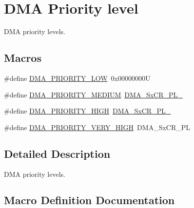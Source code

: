 \hypertarget{group___d_m_a___priority__level}{}\section{D\+MA Priority level}
\label{group___d_m_a___priority__level}


D\+MA priority levels.  


\subsection*{Macros}
\begin{DoxyCompactItemize}
\item 
\#define \mbox{\hyperlink{group___d_m_a___priority__level_ga0d1ed2bc9229ba3c953002bcf3a72130}{D\+M\+A\+\_\+\+P\+R\+I\+O\+R\+I\+T\+Y\+\_\+\+L\+OW}}~0x00000000U
\item 
\#define \mbox{\hyperlink{group___d_m_a___priority__level_gad6fbeee76fd4a02cbed64365bb4c1781}{D\+M\+A\+\_\+\+P\+R\+I\+O\+R\+I\+T\+Y\+\_\+\+M\+E\+D\+I\+UM}}~\mbox{\hyperlink{group___peripheral___registers___bits___definition_ga41b1b2f7bd6f0af932ff0fb7df9336b6}{D\+M\+A\+\_\+\+Sx\+C\+R\+\_\+\+P\+L\+\_}}
\item 
\#define \mbox{\hyperlink{group___d_m_a___priority__level_ga6b2f5c5e22895f8b4bd52a27ec6cae2a}{D\+M\+A\+\_\+\+P\+R\+I\+O\+R\+I\+T\+Y\+\_\+\+H\+I\+GH}}~\mbox{\hyperlink{group___peripheral___registers___bits___definition_ga81817adc8c0ee54dea0f67a1a9e8eb77}{D\+M\+A\+\_\+\+Sx\+C\+R\+\_\+\+P\+L\+\_}}
\item 
\#define \mbox{\hyperlink{group___d_m_a___priority__level_gaed0542331a4d875d1d8d5b2878e9372c}{D\+M\+A\+\_\+\+P\+R\+I\+O\+R\+I\+T\+Y\+\_\+\+V\+E\+R\+Y\+\_\+\+H\+I\+GH}}~D\+M\+A\+\_\+\+Sx\+C\+R\+\_\+\+PL
\end{DoxyCompactItemize}


\subsection{Detailed Description}
D\+MA priority levels. 



\subsection{Macro Definition Documentation}
\mbox{\label{group___d_m_a___priority__level_ga6b2f5c5e22895f8b4bd52a27ec6cae2a}} 
